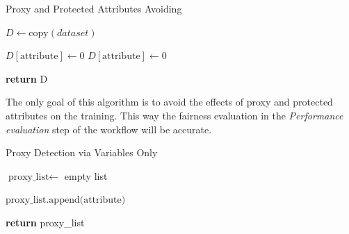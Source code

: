 \begin{algorithm}[H]
    \caption{Proxy and Protected Attributes Avoiding}
    \label{alg:proxy_protected_attributes_avoiding}
    \begin{algorithmic}[1]
        
        \State $D \gets \text{copy}(dataset)$
        
                \State $D[\text{attribute}] \gets 0$ 
            \EndIf
                \State $D[\text{attribute}] \gets 0$
            \EndIf
        \EndFor
        
        \State \textbf{return} D
    \end{algorithmic}
\end{algorithm}

The only goal of this algorithm is to avoid the effects of proxy and protected attributes on the training. This way the fairness evaluation in the \emph{Performance evaluation} step of the workflow will be accurate.


\begin{algorithm}[H]
    \caption{Proxy Detection via Variables Only}
    \label{alg:proxy_detection_variables_only}
    \begin{algorithmic}[1]
        
        \State $\text{proxy\_list} \gets$ empty list\;
        
                    \State $\text{proxy\_list.append(attribute)}$
                \EndIf
            \EndFor
        \EndFor
        
        \State \textbf{return} proxy\_list
    \end{algorithmic}
\end{algorithm}

